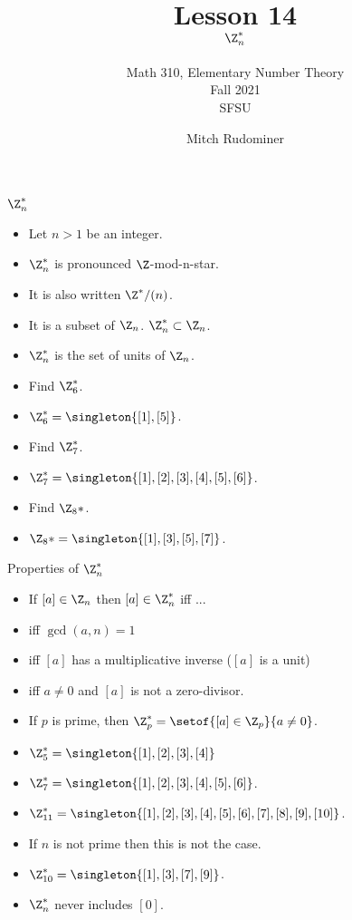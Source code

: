 \documentclass[handout]{beamer}
\title{Lesson 14 \\ $\Z_n^*$}
\subtitle{Math 310, Elementary Number Theory \\ Fall 2021 \\ SFSU}
\author{Mitch Rudominer}
\date{}
\begin{document}
\begin{frame}
  \titlepage
\end{frame}

\begin{frame}{$\Z^*_n$}

\begin{itemize}
  \item Let $n>1$ be an integer.
  \item $\Z^*_n$ is pronounced $\Z$-mod-n-star.
  \item It is also written $\Z^*/(n)$.
  \item It is a subset of $\Z_n$. $\Z_n^* \subset \Z_n$.
  \item $\Z^*_n$ is the set of units of $\Z_n$.
  \item Find $\Z_6^*$.
  \item $\Z_6^*=\singleton{[1],[5]}$.
  \item Find $\Z_7^*$.
  \item $\Z_7^*=\singleton{[1],[2],[3],[4],[5],[6]}$.
  \item Find $\Z_8*$.
  \item $\Z_8* = \singleton{[1],[3],[5],[7]}$.
\end{itemize}

\end{frame}

\begin{frame}{Properties of $\Z^*_n$}

\begin{itemize}
  \item If $[a]\in\Z_n$ then $[a]\in\Z_n^*$ iff ...
  \item iff $\gcd(a,n)=1$
  \item iff $[a]$ has a multiplicative inverse ($[a]$ is a unit)
  \item iff $a\not= 0$ and $[a]$ is not a zero-divisor.
  \item If $p$ is prime, then $\Z_p^*=\setof{[a]\in\Z_p}{a\not=0}$.
  \item $\Z_5^*=\singleton{[1],[2],[3],[4]}$
  \item $\Z_7^*=\singleton{[1],[2],[3],[4],[5],[6]}$.
  \item $\Z_{11}^*=\singleton{[1],[2],[3],[4],[5],[6],[7],[8],[9],[10]}$.
  \item If $n$ is not prime then this is not the case.
  \item $\Z_{10}^*=\singleton{[1],[3],[7],[9]}$.
  \item $\Z_n^*$ never includes $[0]$.
\end{itemize}

\end{frame}
\end{document}
